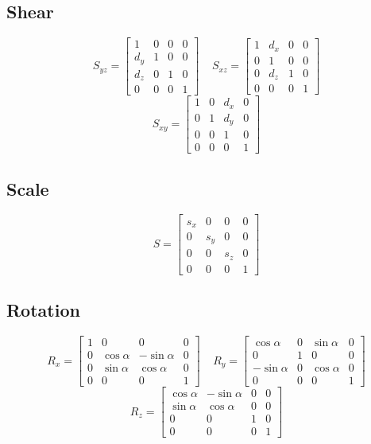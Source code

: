 \documentclass{article}
\begin{document}
\subsection{Shear}
\vspace{.3cm}
\[ S_{yz} = \begin{bmatrix} 1 & 0 & 0 & 0 \\ d_y & 1 & 0 & 0 \\ d_z & 0 & 1 & 0 \\ 0 & 0 & 0 & 1 \end{bmatrix} ~~~~~ S_{xz} = \begin{bmatrix} 1 & d_x & 0 & 0 \\ 0 & 1 & 0 & 0 \\ 0 & d_z & 1 & 0 \\ 0 & 0 & 0 & 1 \end{bmatrix} \]
\[ S_{xy} = \begin{bmatrix} 1 & 0 & d_x & 0 \\ 0 & 1 & d_y & 0 \\ 0 & 0 & 1 & 0 \\ 0 & 0 & 0 & 1 \end{bmatrix} \]

\subsection{Scale}
\vspace{.3cm}
\[ S = \begin{bmatrix} s_x & 0 & 0 & 0 \\ 0 & s_y & 0 & 0 \\ 0 & 0 & s_z & 0 \\ 0 & 0 & 0 & 1 \end{bmatrix} \]

\subsection{Rotation}
\vspace{.3cm}
\[ R_x = \begin{bmatrix} 1 & 0 & 0 & 0 \\ 0 & \cos \alpha & -\sin \alpha & 0 \\ 0 & \sin \alpha & \cos \alpha & 0 \\ 0 & 0 & 0 & 1 \end{bmatrix} ~~~~~ R_y = \begin{bmatrix} \cos \alpha & 0 & \sin \alpha & 0 \\ 0 & 1 & 0 & 0 \\ -\sin \alpha & 0 & \cos \alpha & 0 \\ 0 & 0 & 0 & 1 \end{bmatrix} \]
\[ R_z = \begin{bmatrix} \cos \alpha & -\sin \alpha & 0 & 0 \\ \sin \alpha & \cos \alpha & 0 & 0 \\ 0 & 0 & 1 & 0 \\ 0 & 0 & 0 & 1 \end{bmatrix} \]
\end{document}
